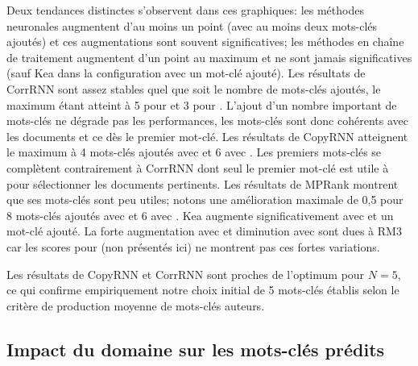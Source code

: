 Deux tendances distinctes s'observent dans ces graphiques: les méthodes neuronales augmentent d'au moins un point (avec au moins deux mots-clés ajoutés) et ces augmentations sont souvent significatives; les méthodes en chaîne de traitement augmentent d'un point au maximum et ne sont jamais significatives (sauf Kea dans la configuration \trm{} avec un mot-clé ajouté).
Les résultats de CorrRNN sont assez stables quel que soit le nombre de mots-clés ajoutés, le maximum étant atteint à 5 pour \tr{} et 3 pour \trm{}.
L'ajout d'un nombre important de mots-clés ne dégrade pas les performances, les mots-clés sont donc cohérents avec les documents et ce dès le premier mot-clé.
Les résultats de CopyRNN atteignent le maximum à 4 mots-clés ajoutés avec \trm{} et 6 avec \tr{}.
Les premiers mots-clés se complètent contrairement à CorrRNN dont seul le premier mot-clé est utile à \bmrm{} pour sélectionner les documents pertinents.
Les résultats de MPRank montrent que ses mots-clés sont peu utiles; notons une amélioration maximale de 0,5 pour 8 mots-clés ajoutés avec \tr{} et 6 avec \trm{}.
Kea augmente significativement avec \trm{} et un mot-clé ajouté. La forte augmentation avec \tr{} et diminution avec \trm{} sont dues à RM3 car les scores pour \bm{} (non présentés ici) ne montrent pas ces fortes variations.


Les résultats de CopyRNN et CorrRNN sont proches de l'optimum pour $N=5$, ce qui confirme empiriquement notre choix initial de 5 mots-clés établis selon le critère de production moyenne de mots-clés auteurs.



\subsection{Impact du domaine sur les mots-clés prédits}\label{sub:impactdom}

